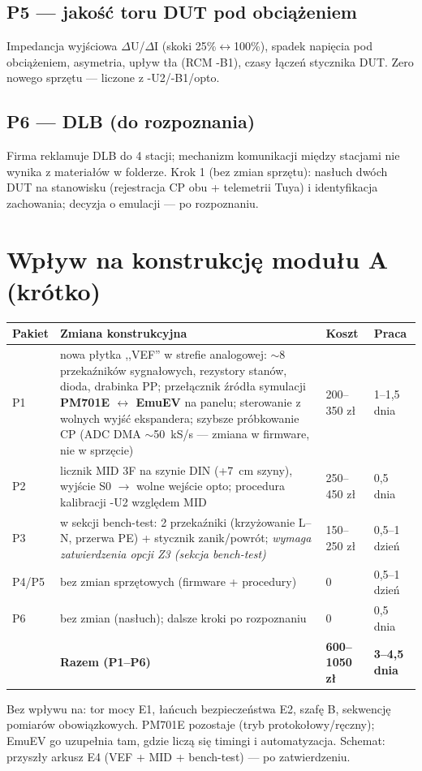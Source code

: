 \documentclass[11pt,a4paper]{article}
\begin{document}
\subsection{P5 --- jakość toru DUT pod obciążeniem}
Impedancja wyjściowa $\Delta$U/$\Delta$I (skoki 25\%$\leftrightarrow$100\%), spadek napięcia pod
obciążeniem, asymetria, upływ tła (RCM -B1), czasy łączeń stycznika DUT. Zero nowego sprzętu ---
liczone z -U2/-B1/opto.
\subsection{P6 --- DLB (do rozpoznania)}
Firma reklamuje DLB do 4 stacji; mechanizm komunikacji między stacjami nie wynika z materiałów
w folderze. Krok 1 (bez zmian sprzętu): nasłuch dwóch DUT na stanowisku (rejestracja CP obu + telemetrii
Tuya) i identyfikacja zachowania; decyzja o emulacji --- po rozpoznaniu.

\section{Wpływ na konstrukcję modułu A (krótko)}
\begin{longtable}{@{}p{}p{}p{}p{}@{}}
\toprule
\textbf{Pakiet} & \textbf{Zmiana konstrukcyjna} & \textbf{Koszt} & \textbf{Praca}\\
\midrule
P1 & nowa płytka ,,VEF'' w strefie analogowej: $\sim$8 przekaźników sygnałowych, rezystory stanów,
dioda, drabinka PP; przełącznik źródła symulacji \textbf{PM701E $\leftrightarrow$ EmuEV} na panelu;
sterowanie z wolnych wyjść ekspandera; szybsze próbkowanie CP (ADC DMA $\sim$50~kS/s --- zmiana
w firmware, nie w sprzęcie) & 200--350 zł & 1--1,5 dnia\\
P2 & licznik MID 3F na szynie DIN (+7~cm szyny), wyjście S0 $\to$ wolne wejście opto; procedura
kalibracji -U2 względem MID & 250--450 zł & 0,5 dnia\\
P3 & w sekcji bench-test: 2 przekaźniki (krzyżowanie L--N, przerwa PE) + stycznik zanik/powrót;
\emph{wymaga zatwierdzenia opcji Z3 (sekcja bench-test)} & 150--250 zł & 0,5--1 dzień\\
P4/P5 & bez zmian sprzętowych (firmware + procedury) & 0 & 0,5--1 dzień\\
P6 & bez zmian (nasłuch); dalsze kroki po rozpoznaniu & 0 & 0,5 dnia\\
\midrule
 & \textbf{Razem (P1--P6)} & \textbf{600--1050 zł} & \textbf{3--4,5 dnia}\\
\bottomrule
\end{longtable}
Bez wpływu na: tor mocy E1, łańcuch bezpieczeństwa E2, szafę B, sekwencję pomiarów obowiązkowych.
PM701E pozostaje (tryb protokołowy/ręczny); EmuEV go uzupełnia tam, gdzie liczą się timingi
i automatyzacja. Schemat: przyszły arkusz E4 (VEF + MID + bench-test) --- po zatwierdzeniu.
\end{document}
